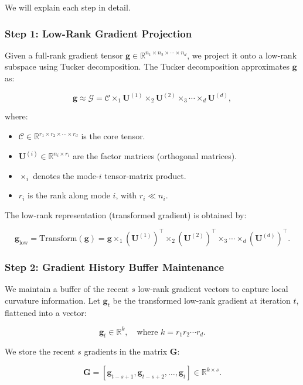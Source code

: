We will explain each step in detail.

\subsubsection{Step 1: Low-Rank Gradient Projection}

Given a full-rank gradient tensor $\boldsymbol{g} \in \mathbb{R}^{n_1 \times n_2 \times \cdots \times n_d}$, we project it onto a low-rank subspace using Tucker decomposition. The Tucker decomposition approximates $\boldsymbol{g}$ as:

\[
\boldsymbol{g} \approx \mathcal{G} = \mathcal{C} \times_1 \mathbf{U}^{(1)} \times_2 \mathbf{U}^{(2)} \times_3 \cdots \times_d \mathbf{U}^{(d)},
\]

where:

\begin{itemize}
    \item $\mathcal{C} \in \mathbb{R}^{r_1 \times r_2 \times \cdots \times r_d}$ is the core tensor.
    \item $\mathbf{U}^{(i)} \in \mathbb{R}^{n_i \times r_i}$ are the factor matrices (orthogonal matrices).
    \item $\times_i$ denotes the mode-$i$ tensor-matrix product.
    \item $r_i$ is the rank along mode $i$, with $r_i \ll n_i$.
\end{itemize}

The low-rank representation (transformed gradient) is obtained by:

\[
\boldsymbol{g}_{\text{low}} = \text{Transform}(\boldsymbol{g}) = \boldsymbol{g} \times_1 (\mathbf{U}^{(1)})^\top \times_2 (\mathbf{U}^{(2)})^\top \times_3 \cdots \times_d (\mathbf{U}^{(d)})^\top.
\]

\subsubsection{Step 2: Gradient History Buffer Maintenance}

We maintain a buffer of the recent $s$ low-rank gradient vectors to capture local curvature information. Let $\boldsymbol{g}_t$ be the transformed low-rank gradient at iteration $t$, flattened into a vector:

\[
\boldsymbol{g}_t \in \mathbb{R}^{k}, \quad \text{where } k = r_1 r_2 \cdots r_d.
\]

We store the recent $s$ gradients in the matrix $\mathbf{G}$:

\[
\mathbf{G} = [\boldsymbol{g}_{t - s + 1}, \boldsymbol{g}_{t - s + 2}, \dots, \boldsymbol{g}_t] \in \mathbb{R}^{k \times s}.
\]

